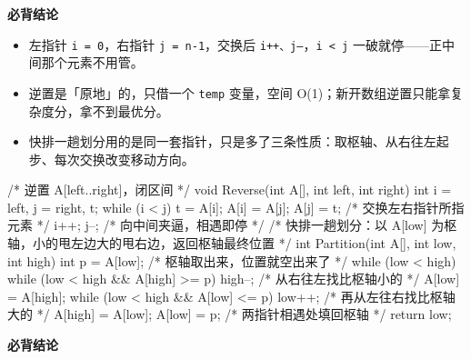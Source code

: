 \documentclass[10pt,a4paper]{ctexart}
\begin{document}


\textbf{必背结论}

\begin{itemize}

\item 左指针 \texttt{i = 0}，右指针 \texttt{j = n-1}，交换后 \texttt{i++、j--}，\texttt{i < j} 一破就停——正中间那个元素不用管。

\item 逆置是「原地」的，只借一个 \texttt{temp} 变量，空间 O(1)；新开数组逆置只能拿复杂度分，拿不到最优分。

\item 快排一趟划分用的是同一套指针，只是多了三条性质：取枢轴、从右往左起步、每次交换改变移动方向。

\end{itemize}

\begin{codebox}
/* 逆置 A[left..right]，闭区间 */
void Reverse(int A[], int left, int right) {
    int i = left, j = right, t;
    while (i < j) {
        t = A[i]; A[i] = A[j]; A[j] = t;   /* 交换左右指针所指元素 */
        i++; j--;                          /* 向中间夹逼，相遇即停 */
    }
}
/* 快排一趟划分：以 A[low] 为枢轴，小的甩左边大的甩右边，返回枢轴最终位置 */
int Partition(int A[], int low, int high) {
    int p = A[low];                        /* 枢轴取出来，位置就空出来了 */
    while (low < high) {
        while (low < high && A[high] >= p) high--;  /* 从右往左找比枢轴小的 */
        A[low] = A[high];
        while (low < high && A[low] <= p) low++;    /* 再从左往右找比枢轴大的 */
        A[high] = A[low];
    }
    A[low] = p;                            /* 两指针相遇处填回枢轴 */
    return low;
}
\end{codebox}




\textbf{必背结论}
\end{document}
